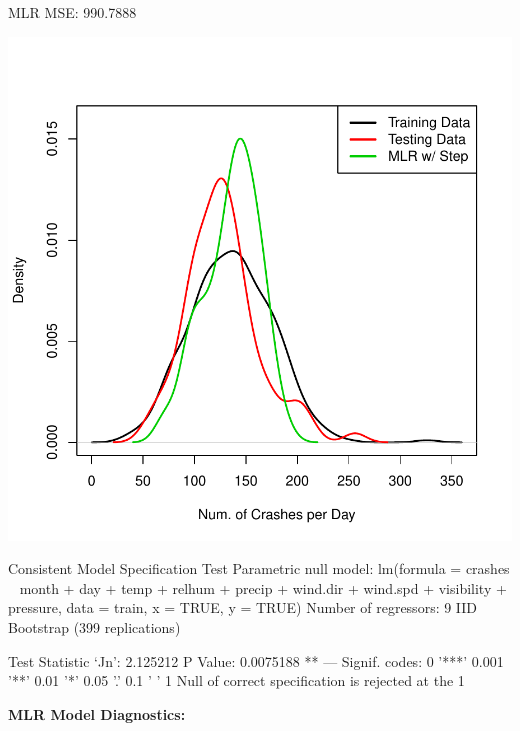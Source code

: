 \documentclass[11pt, a4paper]{article}
\begin{document}
\begin{Schunk}
\begin{Soutput}
MLR MSE: 990.7888
\end{Soutput}
\end{Schunk}
\includegraphics{regression-004}





\begin{Schunk}
\begin{Soutput}
Consistent Model Specification Test
Parametric null model: lm(formula = crashes ~ month + day + temp + relhum +
                          precip + wind.dir + wind.spd + visibility + pressure,
                          data = train, x = TRUE, y = TRUE)
Number of regressors: 9
IID Bootstrap (399 replications)

Test Statistic ‘Jn’: 2.125212	P Value: 0.0075188 **
---
Signif. codes:  0 '***' 0.001 '**' 0.01 '*' 0.05 '.' 0.1 ' ' 1
Null of correct specification is rejected at the 1%
\end{Soutput}
\end{Schunk}

\pagebreak

\noindent\textbf{MLR Model Diagnostics:}
\end{document}

